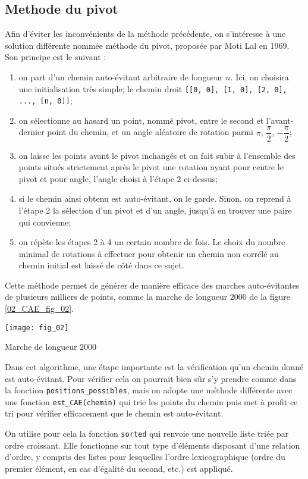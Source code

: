 \subsection*{Methode du pivot}
Afin d’éviter les inconvénients de la méthode précédente, on s’intéresse à une solution différente nommée
méthode du pivot, proposée par Moti Lal en 1969. Son principe est le suivant :
\begin{enumerate}
\item on part d’un chemin auto-évitant arbitraire de longueur $n$. Ici, on choisira une initialisation très simple;
le chemin droit \lstinline{[[0, 0], [1, 0], [2, 0], ..., [n, 0]]};
\item on sélectionne au hasard un point, nommé pivot, entre le second et l’avant-dernier point du chemin,
et un angle aléatoire de rotation parmi $\pi$, $\dfrac{\pi}{2}$, $-\dfrac{\pi}{2}$;
\item on laisse les points avant le pivot inchangés et on fait subir à l’ensemble des points situés strictement
après le pivot une rotation ayant pour centre le pivot et pour angle, l’angle choisi à l’étape 2 ci-dessus;
\item si le chemin ainsi obtenu est auto-évitant, on le garde. Sinon, on reprend à l’étape 2 la sélection d’un
pivot et d’un angle, jusqu’à en trouver une paire qui convienne;
\item on répète les étapes 2 à 4 un certain nombre de fois. Le choix du nombre minimal de rotations à
effectuer pour obtenir un chemin non corrélé au chemin initial est laissé de côté dans ce sujet.
\end{enumerate}
Cette méthode permet de générer de manière efficace des marches auto-évitantes de plusieurs milliers de
points, comme la marche de longueur 2000 de la figure \ref{02_CAE_fig_02}.

\begin{marginfigure}
\texttt{[image: fig\_02]}
\caption{Marche de longueur 2000\label{02_CAE_fig_02}}
\end{marginfigure}

Dans cet algorithme, une étape importante est la vérification qu’un chemin donné est auto-évitant. Pour
vérifier cela on pourrait bien sûr s’y prendre comme dans la fonction \lstinline{positions_possibles}, mais on adopte une méthode différente avec une fonction \lstinline{est_CAE(chemin)} qui trie les points du chemin puis met à profit ce tri pour vérifier efficacement que le chemin est auto-évitant.

On utilise pour cela la fonction \lstinline{sorted} qui renvoie une nouvelle liste triée par ordre croissant. Elle fonctionne
sur tout type d’éléments disposant d’une relation d’ordre, y compris des listes pour lesquelles l’ordre lexicographique (ordre du premier élément, en cas d’égalité du second, etc.) est appliqué. %


